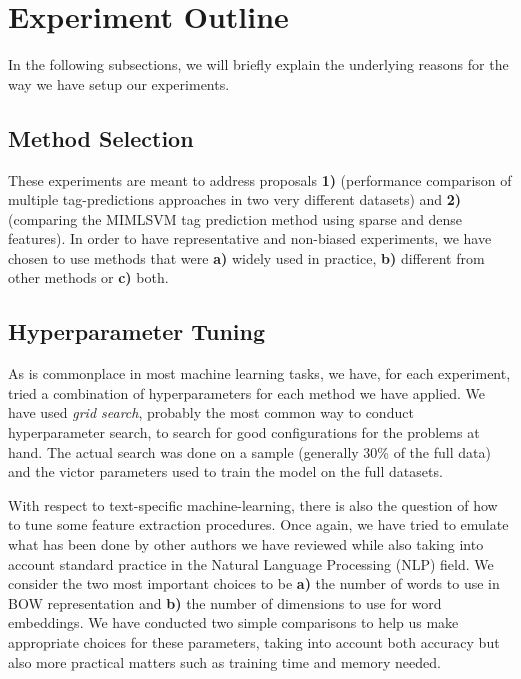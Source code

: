 \section{Experiment Outline}\label{section:experiment_outline}

In the following subsections, we will briefly explain the underlying reasons for the way we have setup our experiments.

\subsection{Method Selection}

These experiments are meant to address proposals \textbf{1)} (performance comparison of multiple tag-predictions approaches in two very different datasets) and \textbf{2)} (comparing the MIMLSVM tag prediction method using sparse and dense features). In order to have representative and non-biased experiments, we have chosen to use methods that were \textbf{a)} widely used in practice, \textbf{b)} different from other methods or \textbf{c)} both.

\subsection{Hyperparameter Tuning}

As is commonplace in most machine learning tasks, we have, for each experiment, tried a combination of hyperparameters for each method we have applied. We have used \textit{grid search}, probably the most common way to conduct hyperparameter search, to search for good configurations for the problems at hand. The actual search was done on a sample (generally 30\% of the full data) and the victor parameters used to train the model on the full datasets.

With respect to text-specific machine-learning, there is also the question of how to tune some feature extraction procedures. Once again, we have tried to emulate what has been done by other authors we have reviewed while also taking into account standard practice in the Natural Language Processing (NLP) field. We consider the two most important choices to be \textbf{a)} the number of words to use in BOW representation and \textbf{b)} the number of dimensions to use for word embeddings. We have conducted two simple comparisons to help us make appropriate choices for these parameters, taking into account both accuracy but also more practical matters such as training time and memory needed.

